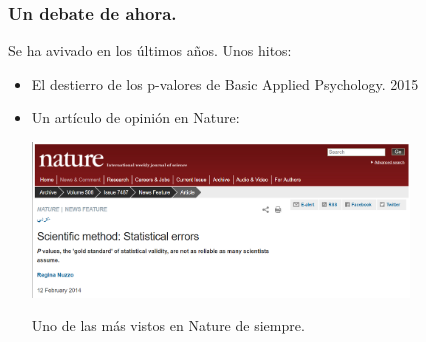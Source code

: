 \documentclass[9pt]{beamer}
\begin{document}
\begin{frame}
  \frametitle{Un debate de ahora.}
Se ha avivado en los últimos años. Unos hitos:\pause

  \begin{itemize}
  \item<2->  El destierro de los p-valores de Basic Applied
    Psychology. 2015
  \item<3-> Un artículo de opinión en Nature:
    \begin{center}
      \includegraphics[width=10cm]{images/nature_nuzzo}
    \end{center}
     Uno de las más vistos en Nature de siempre.
   \end{itemize}

\end{frame}
\end{document}
